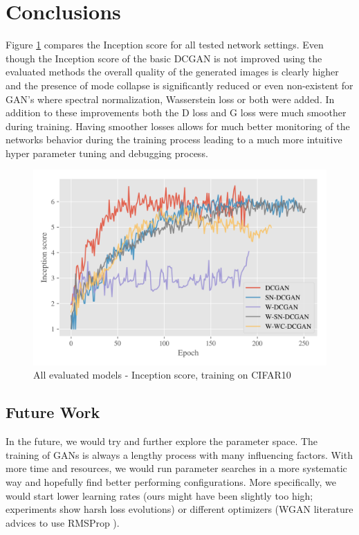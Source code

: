 
\section{Conclusions}
Figure  \ref{fig:exp-all-is} compares the Inception score for all tested network settings. Even though the Inception score of the basic DCGAN is not improved using the evaluated methods the overall quality of the generated images is clearly higher and the presence of mode collapse is significantly reduced or even non-existent for GAN's where spectral normalization, Wasserstein loss or both were added. In addition to these improvements both the D loss and G loss were much smoother during training. Having smoother losses allows for much better monitoring of the networks behavior during the training process leading to a much more intuitive hyper parameter tuning and debugging process. 
\begin{figure}[H]
\centering
\includegraphics[width=\textwidth]{../code/results/figures/all_cifar10_is.png}
\caption{All evaluated models - Inception score, training on CIFAR10}
\label{fig:exp-all-is}
\end{figure}




\subsection{Future Work}
In the future, we would try and further explore the parameter space. The training of GANs is always a lengthy process with many influencing factors. With more time and resources, we would run parameter searches in a more systematic way and hopefully find better performing configurations. More specifically, we would start lower learning rates (ours might have been slightly too high; experiments show harsh loss evolutions) or different optimizers (WGAN literature advices to use RMSProp \cite{arjovsky2017wasserstein}).


